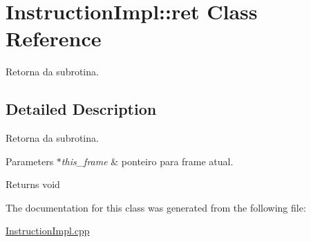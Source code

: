 \hypertarget{class_instruction_impl_1_1ret}{}\section{Instruction\+Impl\+:\+:ret Class Reference}
\label{class_instruction_impl_1_1ret}


Retorna da subrotina.  




\subsection{Detailed Description}
Retorna da subrotina. 


\begin{DoxyParams}{Parameters}
{\em $\ast$this\+\_\+frame} & ponteiro para frame atual. \\
\hline
\end{DoxyParams}
\begin{DoxyReturn}{Returns}
void 
\end{DoxyReturn}


The documentation for this class was generated from the following file\+:\begin{DoxyCompactItemize}
\item 
\hyperlink{_instruction_impl_8cpp}{Instruction\+Impl.\+cpp}\end{DoxyCompactItemize}
